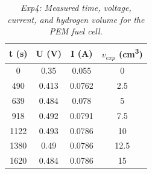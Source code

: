 \begin{table}[H]
\begin{minipage}{0.45\textwidth}
        \centering
        \caption{\textit{Exp4: Measured time, voltage, current, and hydrogen volume for the PEM fuel cell.}}
        \renewcommand{\arraystretch}{1.4} %
        \setlength{\tabcolsep}{8pt} %
        \begin{tabular}{|c|c|c|c|}
            \hline
            \textbf{t (\si{\second})} & \textbf{U (\si{\volt})} & \textbf{I (\si{\ampere})} & \textbf{$v_{exp}$ (\si{\centi\meter\cubed})} \\
            \hline
            0 & 0.35 & 0.055 & 0 \\
            \hline
            490 & 0.413 & 0.0762 & 2.5 \\
            \hline
            639 & 0.484 & 0.078 & 5 \\
            \hline
            918 & 0.492 & 0.0791 & 7.5 \\
            \hline
            1122 & 0.493 & 0.0786 & 10 \\
            \hline
            1380 & 0.49 & 0.0786 & 12.5 \\
            \hline
            1620 & 0.484 & 0.0786 & 15 \\
            \hline
        \end{tabular}
        \label{tab:exp4_results}
    \end{minipage}
\end{table}



